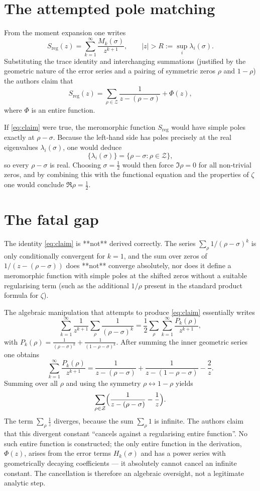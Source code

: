 \documentclass[11pt,a4paper]{article}
\theoremstyle{definition}
\newcommand{\Z}{\mathcal{Z}}          %
\begin{document}
\section{The attempted pole matching}
From the moment expansion one writes
\[
S_{\mathrm{reg}}(z)=\sum_{k=1}^\infty\frac{M_k(\sigma)}{z^{k+1}},
\qquad |z|>R:=\sup_i\lambda_i(\sigma).
\]
Substituting the trace identity and interchanging summations (justified by the geometric nature of the error series and a pairing of symmetric zeros \(\rho\) and \(1-\rho\)) the authors claim that
\begin{equation}\label{eq:claim}
S_{\mathrm{reg}}(z) = \sum_{\rho\in\Z}\frac1{z-(\rho-\sigma)} + \Phi(z),
\end{equation}
where \(\Phi\) is an entire function.

If \eqref{eq:claim} were true, the meromorphic function \(S_{\mathrm{reg}}\) would have simple poles exactly at \(\rho-\sigma\).  Because the left‑hand side has poles precisely at the real eigenvalues \(\lambda_i(\sigma)\), one would deduce
\[
\{\lambda_i(\sigma)\}=\{\rho-\sigma:\rho\in\Z\},
\]
so every \(\rho-\sigma\) is real.  Choosing \(\sigma=\frac12\) would then force \(\Im\rho=0\) for all non‑trivial zeros, and by combining this with the functional equation and the properties of \(\zeta\) one would conclude \(\Re\rho=\frac12\).

\section{The fatal gap}
The identity \eqref{eq:claim} is **not** derived correctly.  The series \(\sum_{\rho}1/(\rho-\sigma)^k\) is only conditionally convergent for \(k=1\), and the sum over zeros of \(1/(z-(\rho-\sigma))\) does **not** converge absolutely, nor does it define a meromorphic function with simple poles at the shifted zeros without a suitable regularising term (such as the additional \(1/\rho\) present in the standard product formula for \(\zeta\)).

The algebraic manipulation that attempts to produce \eqref{eq:claim} essentially writes
\[
\sum_{k=1}^\infty\frac{1}{z^{k+1}}\sum_{\rho}\frac1{(\rho-\sigma)^k}
= \frac12\sum_{\rho}\sum_{k=1}^\infty\frac{P_k(\rho)}{z^{k+1}},
\]
with \(P_k(\rho)=\frac1{(\rho-\sigma)^k}+\frac1{(1-\rho-\sigma)^k}\).  After summing the inner geometric series one obtains
\[
\sum_{k=1}^\infty\frac{P_k(\rho)}{z^{k+1}}
= \frac1{z-(\rho-\sigma)}+\frac1{z-(1-\rho-\sigma)}-\frac2z .
\]
Summing over all \(\rho\) and using the symmetry \(\rho\leftrightarrow1-\rho\) yields
\[
\sum_{\rho\in\Z}\Bigl(\frac1{z-(\rho-\sigma)}-\frac1z\Bigr).
\]
The term \(\sum_\rho\frac1z\) diverges, because the sum \(\sum_\rho 1\) is infinite.  The authors claim that this divergent constant ``cancels against a regularising entire function''.  No such entire function is constructed; the only entire function in the derivation, \(\Phi(z)\), arises from the error terms \(H_k(\sigma)\) and has a power series with geometrically decaying coefficients — it absolutely cannot cancel an infinite constant.  The cancellation is therefore an algebraic oversight, not a legitimate analytic step.
\end{document}
